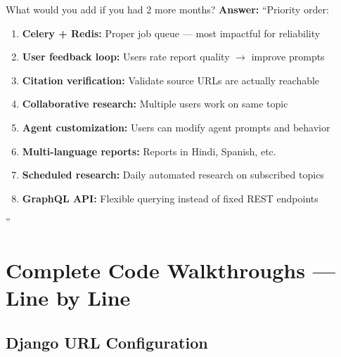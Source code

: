 \documentclass[11pt,a4paper,twoside]{report}
\begin{document}
\begin{interviewbox}{What would you add if you had 2 more months?}
\textbf{Answer:} ``Priority order:
\begin{enumerate}
    \item \textbf{Celery + Redis:} Proper job queue --- most impactful for reliability
    \item \textbf{User feedback loop:} Users rate report quality $\rightarrow$ improve prompts
    \item \textbf{Citation verification:} Validate source URLs are actually reachable
    \item \textbf{Collaborative research:} Multiple users work on same topic
    \item \textbf{Agent customization:} Users can modify agent prompts and behavior
    \item \textbf{Multi-language reports:} Reports in Hindi, Spanish, etc.
    \item \textbf{Scheduled research:} Daily automated research on subscribed topics
    \item \textbf{GraphQL API:} Flexible querying instead of fixed REST endpoints
\end{enumerate}''
\end{interviewbox}



\chapter{Complete Code Walkthroughs --- Line by Line}

\section{Django URL Configuration}
\end{document}
